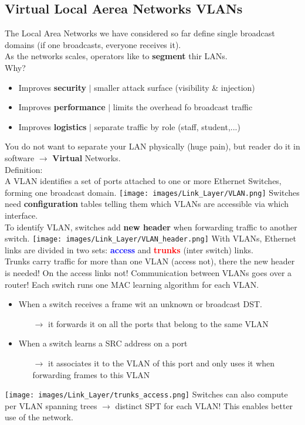 \documentclass[a4paper, fontsize=8pt, landscape, DIV=1]{scrartcl}
\begin{document}
\begin{multicols*}{4}
		\subsection{Virtual Local Aerea Networks VLANs}
		The Local Area Networks we have considered so far define single broadcast
		domains (if one broadcasts, everyone receives it).\\
		As the networks scales, operators like to \textbf{segment} thir LANs.\\
		Why?
		\begin{itemize}[noitemsep]
			\item Improves \textbf{security} $\vert$ smaller attack surface
			(visibility \& injection)
			\item Improves \textbf{performance} $\vert$ limits the overhead fo
			broadcast traffic 
			\item Improves \textbf{logistics} $\vert$ separate traffic by role (staff,
			student,...)
		\end{itemize} 
		You do not want to separate your LAN physically (huge pain), but reader do
		it in software $\rightarrow$ \textbf{Virtual} Networks.\\
		Definition:\\
		A VLAN identifies a set of ports attached to one or more Ethernet Switches,
		forming one broadcast domain. 
		\texttt{[image: images/Link\_Layer/VLAN.png]}
		Switches need \textbf{configuration} tables telling them which VLANs are
		accessible via which interface.\\
		To identify VLAN, switches add \textbf{new header} when forwarding traffic
		to another switch.  
		\texttt{[image: images/Link\_Layer/VLAN\_header.png]}
		With VLANs, Ethernet links are divided in two sets:
		\textcolor{Blue}{\textbf{access}} and \textcolor{Red}{\textbf{trunks}} (inter
		switch) links.\\
		Trunks carry traffic for more than one VLAN (access not), there the new
		header is needed! On the access links not! Communication between VLANs goes over
		a router!
		Each switch runs one MAC learning algorithm for each VLAN.
		\begin{itemize}[noitemsep]
			\item When a switch receives a frame wit an unknown or broadcast DST.
			\begin{itemize}
				\item [$\rightarrow$]	it forwards it on all the ports that belong to the
				same VLAN
			\end{itemize}
			\columnbreak
			\item  When a switch learns a SRC address on a port
			\begin{itemize}
				\item [$\rightarrow$] it associates it to the VLAN of this port and only
				uses it when forwarding frames to this VLAN	
			\end{itemize}
		\end{itemize}
		\texttt{[image: images/Link\_Layer/trunks\_access.png]}
		Switches can also compute per VLAN spanning trees $\rightarrow$ distinct
		SPT for each VLAN! This enables better use of the network. 
		

\end{multicols*}
\end{document}
